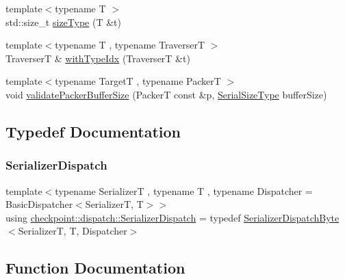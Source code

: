 \begin{DoxyCompactItemize}
\item 
{\footnotesize template$<$typename T $>$ }\\std\+::size\+\_\+t \hyperlink{namespacecheckpoint_1_1dispatch_a803d1b0d7a7611cb5440688dd12a3ccd}{size\+Type} (T \&t)
\item 
{\footnotesize template$<$typename T , typename TraverserT $>$ }\\TraverserT \& \hyperlink{namespacecheckpoint_1_1dispatch_a23852566cd2c0568dac667166adc60b5}{with\+Type\+Idx} (TraverserT \&t)
\item 
{\footnotesize template$<$typename TargetT , typename PackerT $>$ }\\void \hyperlink{namespacecheckpoint_1_1dispatch_a45cd06e9cac244ce0f5cc265ef52fd4e}{validate\+Packer\+Buffer\+Size} (PackerT const \&p, \hyperlink{namespacecheckpoint_a083f6674da3f94c2901b18c6d238217c}{Serial\+Size\+Type} buffer\+Size)
\end{DoxyCompactItemize}


\subsection{Typedef Documentation}
\mbox{\label{namespacecheckpoint_1_1dispatch_ae3a710db2b07fd1322ab9e6b3bbf45b4}} 
\subsubsection{\texorpdfstring{Serializer\+Dispatch}{SerializerDispatch}}
{\footnotesize\ttfamily template$<$typename SerializerT , typename T , typename Dispatcher  = Basic\+Dispatcher$<$\+Serializer\+T, T$>$$>$ \\
using \hyperlink{namespacecheckpoint_1_1dispatch_ae3a710db2b07fd1322ab9e6b3bbf45b4}{checkpoint\+::dispatch\+::\+Serializer\+Dispatch} = typedef \hyperlink{structcheckpoint_1_1dispatch_1_1_serializer_dispatch_byte}{Serializer\+Dispatch\+Byte}$<$SerializerT, T, Dispatcher$>$}



\subsection{Function Documentation}
\mbox{\label{namespacecheckpoint_1_1dispatch_ad92e256ab5d87d2a5a97ed6ed011af9c}} 
